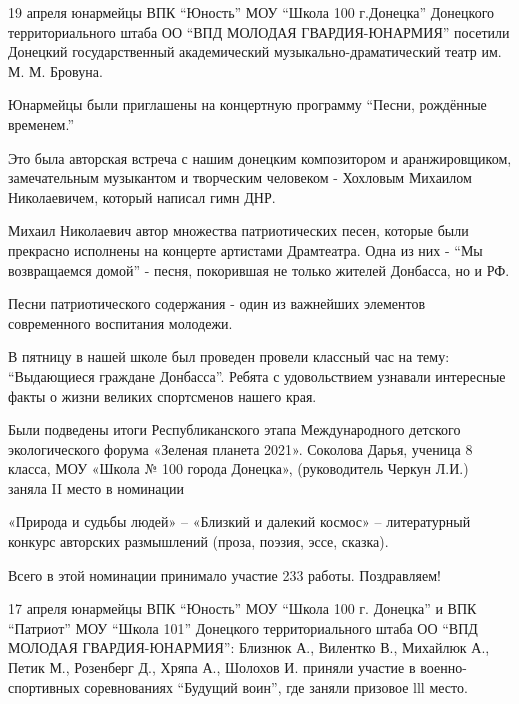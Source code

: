 
19 апреля юнармейцы ВПК \enquote{Юность} МОУ \enquote{Школа 100 г.Донецка}
Донецкого территориального штаба ОО \enquote{ВПД МОЛОДАЯ ГВАРДИЯ-ЮНАРМИЯ}
посетили Донецкий государственный академический музыкально-драматический театр
им. М. М. Бровуна.


Юнармейцы были приглашены на концертную программу \enquote{Песни, рождённые
временем.}

Это была авторская встреча с нашим донецким композитором и аранжировщиком,
замечательным музыкантом и творческим человеком - Хохловым Михаилом
Николаевичем, который написал гимн ДНР.

Михаил Николаевич автор множества патриотических песен, которые были прекрасно
исполнены на концерте артистами Драмтеатра. Одна из них - \enquote{Мы
возвращаемся домой} - песня, покорившая не только жителей Донбасса, но и РФ.

Песни патриотического содержания - один из важнейших элементов современного
воспитания молодежи.


В пятницу в нашей школе был проведен провели классный час на тему: \enquote{Выдающиеся
граждане Донбасса}. Ребята с удовольствием узнавали интересные факты о жизни
великих спортсменов нашего края.



Были подведены итоги Республиканского этапа Международного детского
экологического форума «Зеленая планета 2021». Соколова Дарья, ученица 8 класса,
МОУ «Школа № 100 города Донецка», (руководитель Черкун Л.И.) заняла II место в
номинации 

«Природа и судьбы людей» – «Близкий и далекий космос» – литературный конкурс
авторских размышлений (проза, поэзия, эссе, сказка).

Всего в этой номинации принимало участие 233 работы. Поздравляем!


17 апреля юнармейцы ВПК \enquote{Юность} МОУ \enquote{Школа 100 г. Донецка} и
ВПК \enquote{Патриот} МОУ \enquote{Школа 101} Донецкого территориального штаба
ОО \enquote{ВПД МОЛОДАЯ ГВАРДИЯ-ЮНАРМИЯ}: Близнюк А., Вилентко В., Михайлюк А.,
Петик М., Розенберг Д., Хряпа А., Шолохов И. приняли участие в
военно-спортивных соревнованиях \enquote{Будущий воин}, где заняли призовое lll
место.

